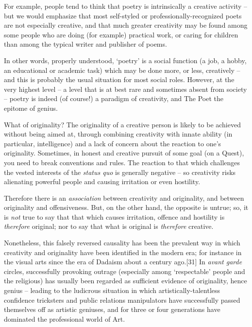 \documentclass[
]{book}
\begin{document}
For example, people tend to think that poetry is intrinsically a creative activity -- but we would emphasize that most self-styled or professionally-recognized poets are not especially creative, and that much greater creativity may be found among some people who are doing (for example) practical work, or caring for children than among the typical writer and publisher of poems.

In other words, properly understood, `poetry' is a social function (a job, a hobby, an educational or academic task) which may be done more, or less, creatively -- and this is probably the usual situation for most social roles. However, at the very highest level -- a level that is at best rare and sometimes absent from society -- poetry is indeed (of course!) a paradigm of creativity, and The Poet the epitome of genius.

What of originality? The originality of a creative person is likely to be achieved without being aimed at, through combining creativity with innate ability (in particular, intelligence) and a lack of concern about the reaction to one's originality. Sometimes, in honest and creative pursuit of some goal (on a Quest), you need to break conventions and rules. The reaction to that which challenges the vested interests of the \emph{status quo} is generally negative -- so creativity risks alienating powerful people and causing irritation or even hostility.

Therefore there is an \emph{association} between creativity and originality, and between originality and offensiveness. But, on the other hand, the opposite is untrue; so, it is \emph{not} true to say that that which causes irritation, offence and hostility is \emph{therefore} original; nor to say that what is original is \emph{therefore} creative.

Nonetheless, this falsely reversed causality has been the prevalent way in which creativity and originality have been identified in the modern era; for instance in the visual arts since the era of Dadaism about a century ago.{[}31{]} In \emph{avant garde} circles, successfully provoking outrage (especially among `respectable' people and the religious) has usually been regarded as sufficient evidence of originality, hence genius -- leading to the ludicrous situation in which artistically-talentless confidence tricksters and public relations manipulators have successfully passed themselves off as artistic geniuses, and for three or four generations have dominated the professional world of Art.
\end{document}
